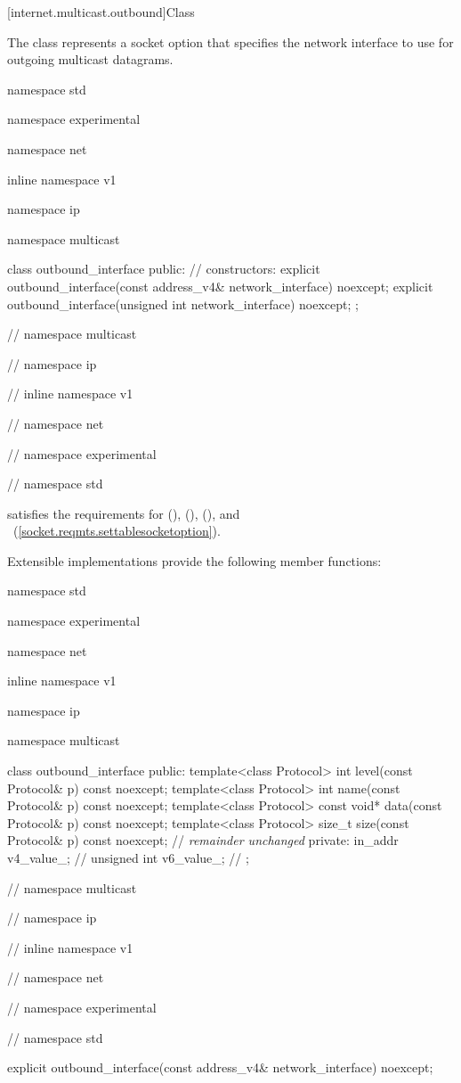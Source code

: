 [internet.multicast.outbound]{Class }

\pnum
The  class represents a socket option that specifies the network interface to use for outgoing multicast datagrams.

\begin{codeblock}
namespace std {
namespace experimental {
namespace net {
inline namespace v1 {
namespace ip {
namespace multicast {

  class outbound_interface
  {
  public:
    // constructors:
    explicit outbound_interface(const address_v4& network_interface) noexcept;
    explicit outbound_interface(unsigned int network_interface) noexcept;
  };

} // namespace multicast
} // namespace ip
} // inline namespace v1
} // namespace net
} // namespace experimental
} // namespace std
\end{codeblock}

\pnum
{} satisfies the requirements for  (),  (),  (), and ~(\ref{socket.reqmts.settablesocketoption}).

\pnum
 Extensible implementations provide the following member functions:

\begin{codeblock}
namespace std {
namespace experimental {
namespace net {
inline namespace v1 {
namespace ip {
namespace multicast {

  class outbound_interface
  {
  public:
    template<class Protocol> int level(const Protocol& p) const noexcept;
    template<class Protocol> int name(const Protocol& p) const noexcept;
    template<class Protocol> const void* data(const Protocol& p) const noexcept;
    template<class Protocol> size_t size(const Protocol& p) const noexcept;
    // \textit{remainder unchanged}
  private:
      in_addr v4_value_; // \expos
      unsigned int v6_value_; // \expos
  };

} // namespace multicast
} // namespace ip
} // inline namespace v1
} // namespace net
} // namespace experimental
} // namespace std
\end{codeblock}

\begin{itemdecl}
explicit outbound_interface(const address_v4& network_interface) noexcept;
\end{itemdecl}


